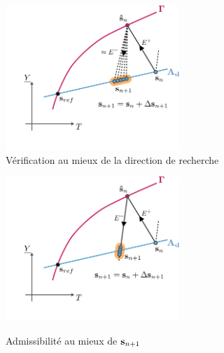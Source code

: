 \documentclass[12pt,a4paper]{report}
\begin{document}
 \begin{figure}[!h]
\begin{center}
\begin{minipage}{5.7cm}
\begin{center}
\includegraphics[height=5.45cm]{LATIN.figure/rech_au_mieux}\\
\caption{Vérification au mieux de la direction de recherche\label{rech_au_mieux}}
\end{center}
\end{minipage}%
\hspace{0.8cm}
\begin{minipage}{5.7cm}
\begin{center}
\includegraphics[height=5.45cm]{LATIN.figure/ad_au_mieux}\\
\caption{Admissibilité au mieux de $\mathbf{s}_{n+1}$\label{ad_au_mieux}}
\end{center}
\end{minipage}
\end{center}
\end{figure}
 
 
\end{document}
